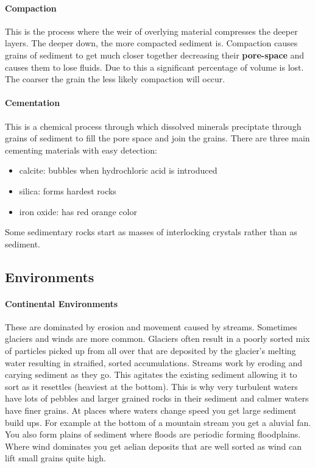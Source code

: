 \documentclass{article}
\begin{document}
\paragraph{Compaction} %
\label{par:compaction}
This is the process where the weir of overlying material compresses the deeper layers. The deeper down, the more compacted sediment is. Compaction causes grains of sediment to get much closer together decreasing their \textbf{pore-space} and causes them to lose fluids. Due to this a significant percentage of volume is lost. The coarser the grain the less likely compaction will occur.

\paragraph{Cementation} %
\label{par:cementation}
This is a chemical process through which dissolved minerals preciptate through grains of sediment to fill the pore space and join the grains.
There are three main cementing materials with easy detection:
\begin{itemize}
    \item calcite: bubbles when hydrochloric acid is introduced
    \item silica: forms hardest rocks
    \item iron oxide: has red orange color
\end{itemize}

Some sedimentary rocks start as masses of interlocking crystals rather than as sediment.
\subsection{Environments} %
\label{sub:environments}
\paragraph{Continental Environments} %
 \label{par:continental_environments}
 These are dominated by erosion and movement caused by streams. Sometimes glaciers and winds are more common. Glaciers often result in a poorly sorted mix of particles picked up from all over that are deposited by the glacier's melting water resulting in straified, sorted accumulations. Streams work by eroding and carying sediment as they go. This agitates the existing sediment allowing it to sort as it resettles (heaviest at the bottom). This is why very turbulent waters have lots of pebbles and larger grained rocks in their sediment and calmer waters have finer grains. At places where waters change speed you get large sediment build ups. For example at the bottom of a mountain stream you get a aluvial fan. You also form plains of sediment where floods are periodic forming floodplains. Where wind dominates you get aelian deposits that are well sorted as wind can lift small grains quite high.
\end{document}
